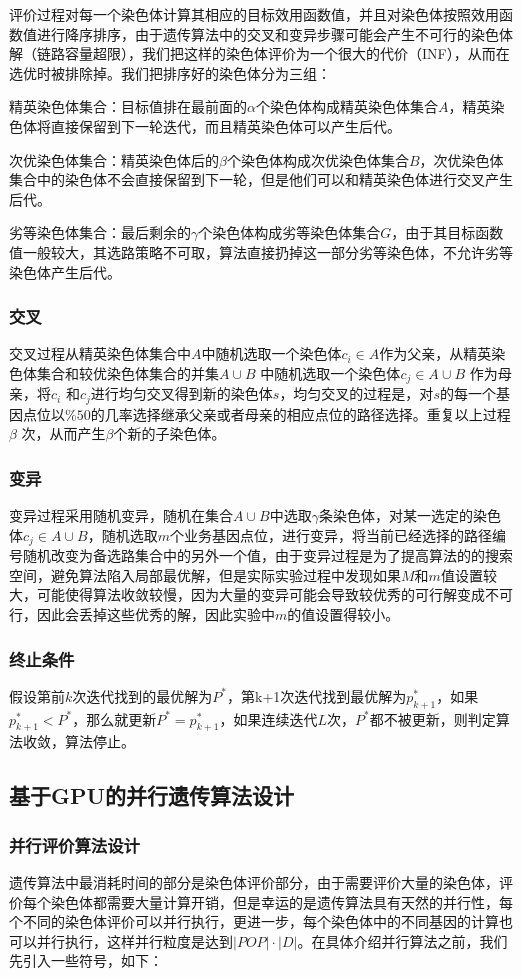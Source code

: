 评价过程对每一个染色体计算其相应的目标效用函数值，并且对染色体按照效用函数值进行降序排序，由于遗传算法中的交叉和变异步骤可能会产生不可行的染色体解（链路容量超限），我们把这样的染色体评价为一个很大的代价（INF），从而在选优时被排除掉。我们把排序好的染色体分为三组：

精英染色体集合：目标值排在最前面的$\alpha$个染色体构成精英染色体集合$A$，精英染色体将直接保留到下一轮迭代，而且精英染色体可以产生后代。

次优染色体集合：精英染色体后的$\beta$个染色体构成次优染色体集合$B$，次优染色体集合中的染色体不会直接保留到下一轮，但是他们可以和精英染色体进行交叉产生后代。

劣等染色体集合：最后剩余的$\gamma$个染色体构成劣等染色体集合$G$，由于其目标函数值一般较大，其选路策略不可取，算法直接扔掉这一部分劣等染色体，不允许劣等染色体产生后代。
\subsubsection{交叉}
交叉过程从精英染色体集合中$A$中随机选取一个染色体$c_i \in A$作为父亲，从精英染色体集合和较优染色体集合的并集$A \cup B$ 中随机选取一个染色体$c_j \in A \cup B$ 作为母亲，将$c_i$ 和$c_j$进行均匀交叉得到新的染色体$s$，均匀交叉的过程是，对$s$的每一个基因点位以$\%50$的几率选择继承父亲或者母亲的相应点位的路径选择。重复以上过程$\beta$ 次，从而产生$\beta$个新的子染色体。
\subsubsection{变异}
变异过程采用随机变异，随机在集合$A \cup B$中选取$\gamma$条染色体，对某一选定的染色体$c_j \in A \cup B$，随机选取$m$个业务基因点位，进行变异，将当前已经选择的路径编号随机改变为备选路集合中的另外一个值，由于变异过程是为了提高算法的的搜索空间，避免算法陷入局部最优解，但是实际实验过程中发现如果$M$和$m$值设置较大，可能使得算法收敛较慢，因为大量的变异可能会导致较优秀的可行解变成不可行，因此会丢掉这些优秀的解，因此实验中$m$的值设置得较小。
\subsubsection{终止条件}
假设第前$k$次迭代找到的最优解为$P^*$，第k+1次迭代找到最优解为$p_{k+1}^*$，如果$p_{k+1}^*<P^*$，那么就更新$P^*=p_{k+1}^*$，如果连续迭代$L$次，$P^*$都不被更新，则判定算法收敛，算法停止。
\subsection{基于GPU的并行遗传算法设计}
\subsubsection{并行评价算法设计}
遗传算法中最消耗时间的部分是染色体评价部分，由于需要评价大量的染色体，评价每个染色体都需要大量计算开销，但是幸运的是遗传算法具有天然的并行性，每个不同的染色体评价可以并行执行，更进一步，每个染色体中的不同基因的计算也可以并行执行，这样并行粒度是达到$|POP|\cdot|D|$。在具体介绍并行算法之前，我们先引入一些符号，如下：

